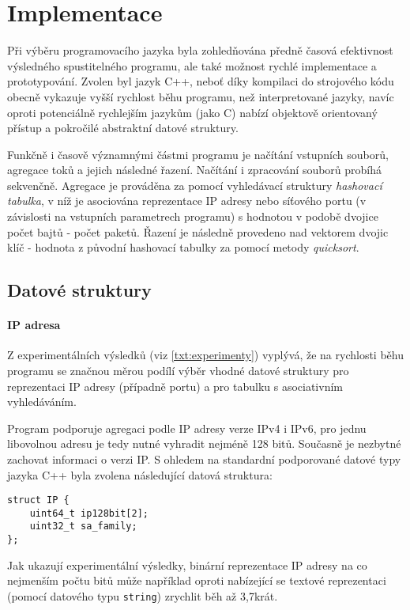\documentclass[12pt,a4paper,titlepage,final]{article}
\begin{document}
\section{Implementace} \label{txt:implementace}
Při výběru programovacího jazyka byla zohledňována předně časová efektivnost výsledného spustitelného programu, ale také možnost rychlé implementace a prototypování. Zvolen byl jazyk C++, neboť díky kompilaci do strojového kódu obecně vykazuje vyšší rychlost běhu programu, než interpretované jazyky, navíc oproti potenciálně rychlejším jazykům (jako C) nabízí objektově orientovaný přístup a pokročilé abstraktní datové struktury.

Funkčně i časově významnými částmi programu je načítání vstupních souborů, agregace toků a jejich následné řazení. Načítání i zpracování souborů probíhá sekvenčně. Agregace je prováděna za pomocí vyhledávací struktury \emph{hashovací tabulka}, v níž je asociována reprezentace IP adresy nebo síťového portu (v závislosti na vstupních parametrech programu) s hodnotou v podobě dvojice počet bajtů - počet paketů. Řazení je následně provedeno nad vektorem dvojic klíč - hodnota z původní hashovací tabulky za pomocí metody \emph{quicksort}. 
	
\subsection{Datové struktury}

\paragraph{IP adresa }
Z experimentálních výsledků (viz \ref{txt:experimenty}) vyplývá, že na rychlosti běhu programu se značnou měrou podílí výběr vhodné datové struktury pro reprezentaci IP adresy (případně portu) a pro tabulku s asociativním vyhledáváním.

Program podporuje agregaci podle IP adresy verze IPv4 i IPv6, pro jednu libovolnou adresu je tedy nutné vyhradit nejméně 128 bitů. Současně je nezbytné zachovat informaci o verzi IP. S ohledem na standardní podporované datové typy jazyka C++ byla zvolena následující datová struktura:

\begin{verbatim}
struct IP {
    uint64_t ip128bit[2];
    uint32_t sa_family;
};
\end{verbatim}

Jak ukazují experimentální výsledky, binární reprezentace IP adresy na co nejmenším počtu bitů může například oproti nabízející se textové reprezentaci (pomocí datového typu \texttt{string}) zrychlit běh až 3,7krát.
\end{document}
